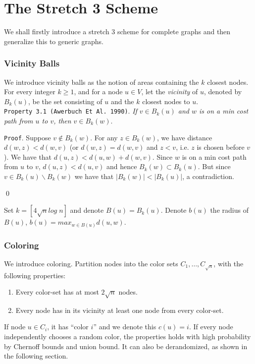 \chapter{The Stretch 3 Scheme}
We shall firstly introduce a stretch 3 scheme for complete graphs and then
generalize this to generic graphs.

\subsection{Vicinity Balls}
We introduce vicinity balls as the notion of areas containing the $k$ closest
nodes. For every integer $k \geq 1$, and for a node $u \in V$, let the
\textit{vicinity} of $u$, denoted by $B_k(u)$, be the set consisting of $u$
and the $k$ closest nodes to $u$.\\

\texttt{Property 3.1 (Awerbuch Et Al. 1990)}. \textit{If $v\in B_k(u)$ and $w$ 
is on a min cost path from $u$ to $v$, then $v\in B_k(w)$}.

\texttt{Proof}. Suppose $v\not\in B_k(w)$. For any $z\in B_k(w)$, we have
distance $d(w,z) < d(w,v)$ (or $d(w,z) = d(w,v)$ and $z < v$, i.e. $z$ is
chosen before $v$). We have that $d(u,z) < d(u,w) + d(w,v)$. Since $w$ is
on a min cost path from $u$ to $v$, $d(u,z) < d(u,v)$ and hence $B_k(w)
\subset B_k(u)$. But since $v\in B_k(u) \backslash B_k(w)$ we have that $|B_k(w)| <
|B_k(u)|$, a contradiction.

\qed

Set $k=[4 \sqrt{n}log\; n]$ and denote $B(u) = B_k(u)$. Denote $b(u)$ the
radius of $B(u)$, $b(u)=max_{w\in B(u)} d(u,w)$.

\subsection{Coloring}
We introduce coloring.
Partition nodes into the color sets $C_1,\dots,C_{\sqrt{n}}$, with the
following properties:
\begin{enumerate}
    \item Every color-set has at most $2 \sqrt{n}$ nodes.
    \item Every node has in its vicinity at least one node from every
color-set.
\end{enumerate}

If node $u\in C_i$, it has ``color $i$'' and we denote this $c(u)=i$. If every
node independently chooses a random color, the properties holds with high
probability by Chernoff bounds and union bound. It can also be derandomized,
as shown in the following section.

